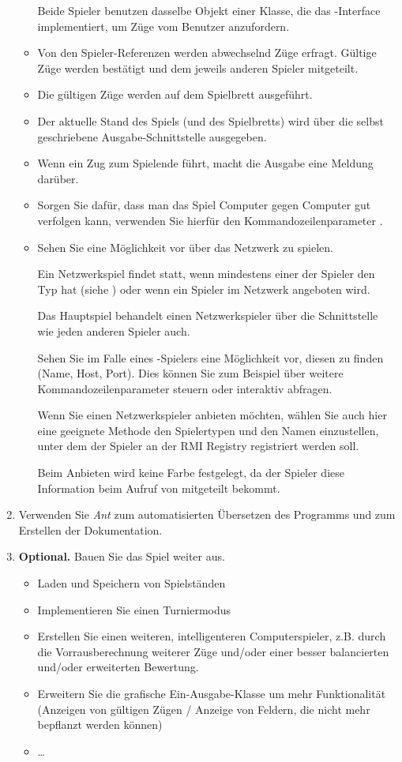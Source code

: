 \begin{enumerate}
\begin{itemize}
Beide Spieler benutzen dasselbe Objekt einer Klasse, die das -Interface implementiert, um Züge vom Benutzer anzufordern.
\item Von den Spieler-Referenzen werden abwechselnd Züge erfragt. Gültige Züge werden bestätigt und dem jeweils anderen Spieler mitgeteilt.
\item Die gültigen Züge werden auf dem Spielbrett ausgeführt.
\item Der aktuelle Stand des Spiels (und des Spielbretts) wird über die selbst geschriebene Ausgabe-Schnittstelle ausgegeben.
\item Wenn ein Zug zum Spielende führt, macht die Ausgabe eine Meldung darüber.
\item Sorgen Sie dafür, dass man das Spiel Computer gegen Computer gut verfolgen kann, verwenden Sie hierfür den Kommandozeilenparameter .
\item Sehen Sie eine Möglichkeit vor über das Netzwerk zu spielen. 

Ein Netzwerkspiel findet statt, wenn mindestens einer der Spieler den Typ  hat (siehe ) oder wenn ein Spieler im Netzwerk angeboten wird.

Das Hauptspiel behandelt einen Netzwerkspieler über die Schnittstelle\\  wie jeden anderen Spieler auch.

Sehen Sie im Falle eines -Spielers eine Möglichkeit vor, diesen zu finden (Name, Host, Port). Dies können Sie zum Beispiel über weitere Kommandozeilenparameter steuern oder interaktiv abfragen.

Wenn Sie einen Netzwerkspieler anbieten möchten, wählen Sie auch hier eine geeignete Methode den Spielertypen und den Namen einzustellen, unter dem der Spieler an der RMI Registry registriert werden soll.

Beim Anbieten wird keine Farbe festgelegt, da der Spieler diese Information beim Aufruf von  mitgeteilt bekommt.
\end{itemize}

\item Verwenden Sie \emph{Ant} zum automatisierten Übersetzen des Programms und zum Erstellen der Dokumentation.

\item \textbf{Optional.} Bauen Sie das Spiel weiter aus.
\begin{itemize}
\item Laden und Speichern von Spielständen
\item Implementieren Sie einen Turniermodus
\item Erstellen Sie einen weiteren, intelligenteren Computerspieler, z.B. durch die Vorrausberechnung weiterer Züge und/oder einer besser balancierten und/oder erweiterten Bewertung.
\item Erweitern Sie die grafische Ein-Ausgabe-Klasse um mehr Funktionalität (Anzeigen von gültigen Zügen / Anzeige von Feldern, die nicht mehr bepflanzt werden können)
\item \dots
\end{itemize}
\end{enumerate}
